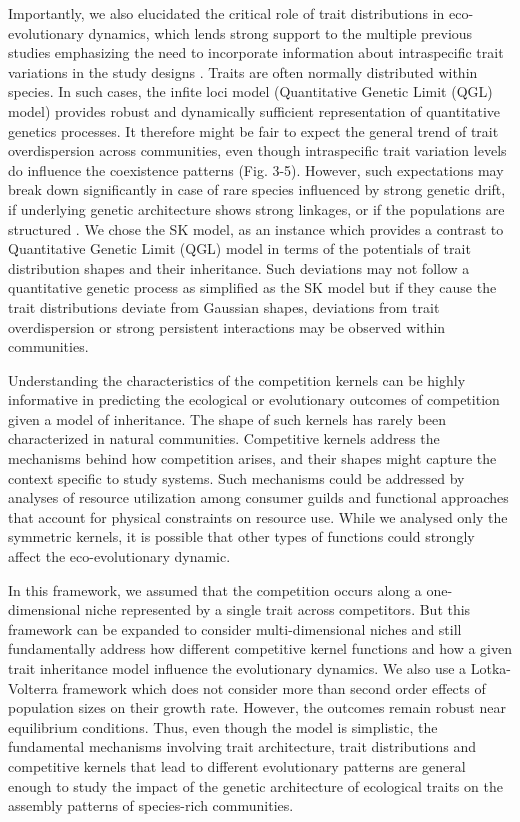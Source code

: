 \documentclass[12pt]{article}
\begin{document}
Importantly, we also elucidated the critical role of trait distributions in eco-evolutionary dynamics, which lends strong support to the multiple previous studies emphasizing the need to incorporate information about intraspecific trait variations in the study designs \cite[e.g.][]{bolnick2011intraspecific}. Traits are often normally distributed within species. In such cases, the infite loci model (Quantitative Genetic Limit (QGL) model) provides robust and dynamically sufficient representation of quantitative genetics processes. It therefore might be fair to expect the general trend of trait overdispersion across communities, even though intraspecific trait variation levels do influence the coexistence patterns (Fig. 3-5). However, such expectations may break down significantly in case of rare species influenced by strong genetic drift, if underlying genetic architecture shows strong linkages, or if the populations are structured \cite{Barton2017}. We chose the SK model, as an instance which provides a contrast to Quantitative Genetic Limit (QGL) model in terms of the potentials of trait distribution shapes and their inheritance. Such deviations may not follow a quantitative genetic process as simplified as the SK model but if they cause the trait distributions deviate from Gaussian shapes, deviations from trait overdispersion or strong persistent interactions may be observed within communities.\par

Understanding the characteristics of the competition kernels can be highly informative in predicting the ecological or evolutionary outcomes of competition given a model of inheritance. The shape of such kernels has rarely been characterized in natural communities. Competitive kernels address the mechanisms behind how competition arises, and their shapes might capture the context specific to study systems. Such mechanisms could be addressed by analyses of resource utilization among consumer guilds and functional approaches that account for physical constraints on resource use. While we analysed only the symmetric kernels, it is possible that other types of functions could strongly affect the eco-evolutionary dynamic.\par 

In this framework, we assumed that the competition occurs along a one-dimensional niche represented by a single trait across competitors. But this framework can be expanded to consider multi-dimensional niches and still fundamentally address how different competitive kernel functions and how a given trait inheritance model influence the evolutionary dynamics. We also use a Lotka-Volterra framework which does not consider more than second order effects of population sizes on their growth rate. However, the outcomes remain robust near equilibrium conditions. Thus, even though the model is simplistic,  the fundamental mechanisms involving trait architecture, trait distributions and competitive kernels that lead to different evolutionary patterns are general enough to study the impact of the genetic architecture of ecological traits on the assembly patterns of species-rich communities.
\end{document}
